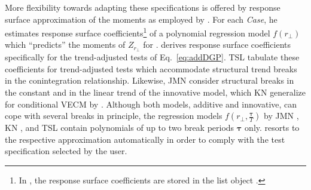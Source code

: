 More flexibility towards adapting these specifications is offered by response surface approximation of the moments as employed by \citet{Doornik1998}. For each \textit{Case}, he estimates response surface coefficients\footnote{In , the response surface coefficients are stored in the list object .} of a polynomial regression model $ f(r_\perp) $ which ``predicts'' the moments of $ Z_{r_\perp} $ for \citet{Johansen1996}. \citet{Trenkler2008} derives response surface coefficients specifically for the trend-adjusted tests of Eq.~\eqref{eq:addDGP}. TSL \citeyearpar{TrenklerEtAl2008} tabulate these coefficients for trend-adjusted tests which accommodate structural trend breaks in the conintegration relationship. Likewise, JMN \citeyearpar{JohansenEtAl2000} consider structural breaks in the constant and in the linear trend of the innovative model, which KN \citeyearpar{KuritaNielsen2019} generalize for conditional VECM by \citet[Ch.~9]{Doornik1998}. Although both models, additive and innovative, can cope with several breaks in principle, the regression models $ f \left(r_\perp, \frac{\boldsymbol{\tau}}{T} \right) $ by JMN \citeyearpar{JohansenEtAl2000}, KN \citeyearpar{KuritaNielsen2019}, and TSL \citeyearpar{TrenklerEtAl2008} contain polynomials of up to two break periods $ \boldsymbol{\tau} $ only.  resorts to the respective approximation automatically in order to comply with the test specification selected by the user.



